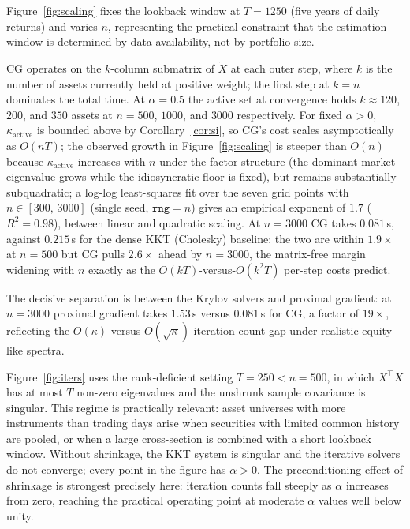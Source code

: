 Figure~\ref{fig:scaling} fixes the lookback window at $T = 1250$ (five years of daily
returns) and varies $n$, representing the practical constraint that the estimation window
is determined by data availability, not by portfolio size.

CG operates on the $k$-column submatrix of $\tilde{X}$ at each outer step, where $k$ is
the number of assets currently held at positive weight; the first step at $k = n$
dominates the total time. At $\alpha = 0.5$ the active set at convergence holds
$k \approx 120$, $200$, and $350$ assets at $n = 500$, $1000$, and $3000$ respectively.
For fixed $\alpha > 0$, $\kappa_{\mathrm{active}}$ is bounded above by
Corollary~\ref{cor:si}, so CG's cost scales asymptotically as $O(nT)$; the observed
growth in Figure~\ref{fig:scaling} is steeper than $O(n)$ because $\kappa_{\mathrm{active}}$
increases with $n$ under the factor structure (the dominant market eigenvalue grows while
the idiosyncratic floor is fixed), but remains substantially subquadratic;
a log-log least-squares fit over the seven grid points with $n \in [300,\,3000]$
(single seed, $\texttt{rng}=n$) gives an empirical exponent of $1.7$ ($R^2 = 0.98$),
between linear and quadratic scaling.
At $n=3000$ CG takes $0.081$\,s, against $0.215$\,s for the dense KKT (Cholesky) baseline:
the two are within $1.9\times$ at $n=500$ but CG pulls $2.6\times$ ahead by $n=3000$, the
matrix-free margin widening with $n$ exactly as the $O(kT)$-versus-$O(k^2 T)$ per-step costs
predict.

The decisive separation is between the Krylov solvers and proximal gradient: at $n=3000$
proximal gradient takes $1.53$\,s versus $0.081$\,s for CG, a factor of $19\times$,
reflecting the $O(\kappa)$ versus $O(\sqrt\kappa)$ iteration-count gap under realistic
equity-like spectra.

Figure~\ref{fig:iters} uses the rank-deficient setting $T = 250 < n = 500$, in which $X^\top X$ has at most $T$ non-zero
eigenvalues and the unshrunk sample covariance is singular. This regime is practically relevant: asset universes with
more instruments than trading days arise when securities with limited common history are pooled, or when a large
cross-section is combined with a short lookback window. Without shrinkage, the KKT system is singular and the iterative
solvers do not converge; every point in the figure has $\alpha > 0$. The preconditioning effect of shrinkage is strongest
precisely here: iteration counts fall steeply as $\alpha$ increases from zero, reaching the practical operating point at
moderate $\alpha$ values well below unity.

